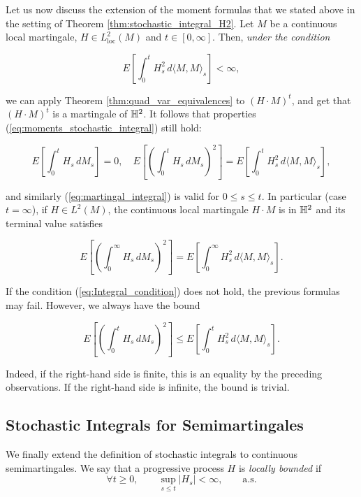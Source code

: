 \documentclass[../Main.tex]{subfiles}
\begin{document}
Let us now discuss the extension of the moment formulas that we stated above in the setting of Theorem \ref{thm:stochastic_integral_H2}. Let $M$ be a continuous local martingale, $H \in L_{\mathrm{loc}}^2(M)$ and $t \in [0, \infty]$. Then, \textit{under the condition}

\begin{equation} \label{eq:Integral_condition}
E\left[\int_0^t H_s^2 \, d\langle M, M \rangle_s\right] < \infty, 
\end{equation}

we can apply Theorem \ref{thm:quad_var_equivalences} to $(H \cdot M)^t$, and get that $(H \cdot M)^t$ is a martingale of $\mathbb{H}^2$. It follows that properties (\ref{eq:moments_stochastic_integral}) still hold:

$$E\left[\int_0^t H_s \, dM_s\right] = 0, \quad E\left[\left(\int_0^t H_s \, dM_s\right)^2\right] = E\left[\int_0^t H_s^2 \, d\langle M, M \rangle_s\right],$$

and similarly (\ref{eq:martingal_integral}) is valid for $0 \le s \le t$. In particular (case $t = \infty$), if $H \in L^2(M)$, the continuous local martingale $H \cdot M$ is in $\mathbb{H}^2$ and its terminal value satisfies


$$E\left[\left(\int_0^\infty H_s \, dM_s\right)^2\right] = E\left[\int_0^\infty H_s^2 \, d\langle M, M \rangle_s\right].$$

If the condition (\ref{eq:Integral_condition}) does not hold, the previous formulas may fail. However, we always have the bound

\begin{equation} \label{eq:Integral_bound}
E\left[\left(\int_0^t H_s \, dM_s\right)^2\right] \le E\left[\int_0^t H_s^2 \, d\langle M, M \rangle_s\right]. 
\end{equation}

Indeed, if the right-hand side is finite, this is an equality by the preceding observations. If the right-hand side is infinite, the bound is trivial.

\subsection{Stochastic Integrals for Semimartingales}

We finally extend the definition of stochastic integrals to continuous
semimartingales. We say that a progressive process $H$ is \emph{locally
bounded} if
$$
\forall t\ge 0,\qquad \sup_{s\le t}|H_s|<\infty,
\qquad \text{a.s.}
$$
\end{document}
